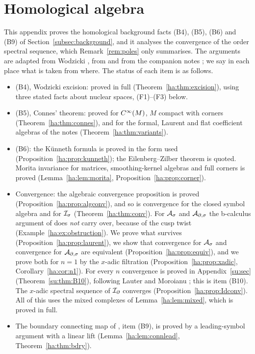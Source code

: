 \section{Homological algebra}\label{ha:sec}

\providecommand{\fA}{\mathfrak A}
\providecommand{\hot}{\mathbin{\widehat\otimes}}
\providecommand{\Sh}{\operatorname{Sh}}
\providecommand{\Om}{\Omega}
\providecommand{\dOm}{\dot\Omega}

This appendix proves the homological background facts (B4), (B5), (B6)
and (B9) of Section~\ref{subsec:background}, and it analyses the convergence of the
order spectral sequence, which Remark~\ref{rem:poles} only summarises. The
arguments are adapted from Wodzicki \cite{Wodzicki}, from
\cite[Ch.~10]{MelroseMicro} and from the companion notes \cite{HHb}; we
say in each place what is taken from where. The status of each item is as
follows.
\begin{itemize}
\item (B4), Wodzicki excision: proved in full
(Theorem~\ref{ha:thm:excision}), using three stated facts about nuclear
spaces, (F1)--(F3) below.
\item (B5), Connes' theorem: proved for \(C^\infty(M)\), \(M\) compact with
corners (Theorem~\ref{ha:thm:connes}), and for the formal, Laurent and
flat coefficient algebras of the notes (Theorem~\ref{ha:thm:variants}).
\item (B6): the Künneth formula is proved in the form used
(Proposition~\ref{ha:prop:kunneth}); the Eilenberg--Zilber theorem is
quoted. Morita invariance for matrices, smoothing-kernel algebras and
full corners is proved (Lemma~\ref{ha:lem:morita},
Proposition~\ref{ha:prop:corner}).
\item Convergence: the algebraic convergence proposition is proved
(Proposition~\ref{ha:prop:algconv}), and so is convergence for the
closed symbol algebra and for \(\mathcal I_\sigma\) (Theorem~\ref{ha:thm:conv}). For
\(\mathcal A_\sigma\) and \(\mathcal A_{\partial,\sigma}\) the b-calculus argument of \cite{HHb} does
\emph{not} carry over, because of the cusp twist
(Example~\ref{ha:ex:obstruction}). We prove what survives
(Proposition~\ref{ha:prop:laurent}), we show that convergence for \(\mathcal A_\sigma\)
and convergence for \(\mathcal A_{\partial,\sigma}\) are equivalent
(Proposition~\ref{ha:prop:equiv}), and we prove both for \(n=1\) by the
\(x\)-adic filtration (Proposition~\ref{ha:prop:xadic},
Corollary~\ref{ha:cor:n1}). For every \(n\) convergence is proved in
Appendix~\ref{su:sec} (Theorem~\ref{su:thm:B10}), following Lauter and
Moroianu \cite{LauterMoroianu}; this is item (B10). The \(x\)-adic
spectral sequence of \(\mathcal I_\partial\) converges (Proposition~\ref{ha:prop:Idconv}).
All of this uses the mixed complexes of Lemma~\ref{ha:lem:mixed}, which is
proved in full.
\item The boundary connecting map of \cite[Prop.~5(3)]{MN}, item (B9), is
proved by a leading-symbol argument with a linear lift
(Lemma~\ref{ha:lem:connlead}, Theorem~\ref{ha:thm:bdry}).
\end{itemize}

